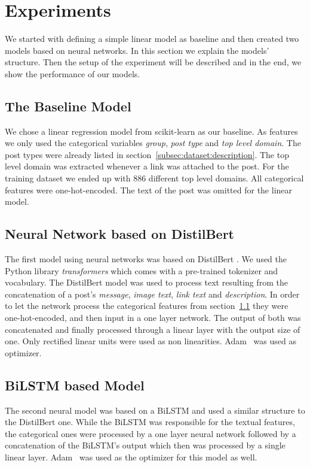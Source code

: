 \section{Experiments}
\label{sec:experiments}
We started with defining a simple linear model as baseline and then created two  models
based on neural networks. In this section we explain the models' structure. Then the
setup of the  experiment will be described and in the end, we show the performance of our
models.

\subsection{The Baseline Model}
\label{subsec:experiments:baselinemodel}
We chose a linear regression model from scikit-learn \citep{scikit-learn} as our baseline. As
features we only used the categorical variables \emph{group}, \emph{post type} and \emph{top level 
domain}. The post types were already listed in section~\ref{subsec:dataset:description}.
The top level domain was extracted whenever a link was attached to the post. For the training 
dataset we ended up with 886 different top level domains. All categorical features were 
one-hot-encoded. The text of the post was omitted for the linear model.


\subsection{Neural Network based on DistilBert} 
\label{subsec:experiments:distilbertmodel}
The first model using neural networks was based on DistilBert \citep{sanh2020distilbert}.
We used the Python library \emph{transformers} \citep{wolf-etal-2020-transformers} which 
comes with a pre-trained tokenizer and vocabulary. The DistilBert model was used to
process text resulting from the concatenation of a post's \emph{message}, \emph{image text}, 
\emph{link text} and \emph{description}. In order to let the network process the categorical
features from section~\ref{subsec:experiments:baselinemodel} they were one-hot-encoded,
and then input in a one layer network.  The output of both was concatenated and finally
processed through a linear layer with the output size of one. Only rectified linear units
were used as non linearities. Adam~\citep{DBLP:journals/corr/KingmaB14} was used as
optimizer.

\subsection{BiLSTM based Model} 
\label{subsec:experiments:bilstmmodel}
The second neural model was based on a BiLSTM and used a similar structure to the
DistilBert one.  While the BiLSTM was responsible for the textual features, the
categorical ones were processed by a  one layer neural network followed by a concatenation
of the BiLSTM's output which  then was processed by a single linear layer. Adam~\citep{DBLP:journals/corr/KingmaB14} was used as the optimizer for this model as well.

